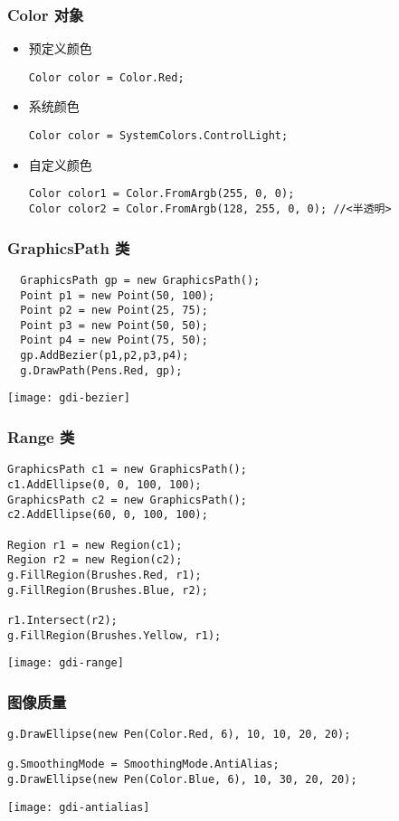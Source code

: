 \begin{frame}[fragile]
\frametitle{Color 对象}
\begin{itemize}
\item 预定义颜色
\begin{lstlisting}
Color color = Color.Red;
\end{lstlisting}
\item 系统颜色
\begin{lstlisting}
Color color = SystemColors.ControlLight;
\end{lstlisting}
\item 自定义颜色
\begin{lstlisting}[escapeinside=<>]
Color color1 = Color.FromArgb(255, 0, 0);
Color color2 = Color.FromArgb(128, 255, 0, 0); //<半透明>
\end{lstlisting}
\end{itemize}
\end{frame}

\begin{frame}[fragile]
\frametitle{GraphicsPath 类}
\begin{lstlisting}
  GraphicsPath gp = new GraphicsPath();
  Point p1 = new Point(50, 100);
  Point p2 = new Point(25, 75);
  Point p3 = new Point(50, 50);
  Point p4 = new Point(75, 50);
  gp.AddBezier(p1,p2,p3,p4);
  g.DrawPath(Pens.Red, gp);
\end{lstlisting}
\texttt{[image: gdi-bezier]}
\end{frame}

\begin{frame}[fragile]
\frametitle{Range 类}
\begin{lstlisting}
GraphicsPath c1 = new GraphicsPath();
c1.AddEllipse(0, 0, 100, 100);
GraphicsPath c2 = new GraphicsPath();
c2.AddEllipse(60, 0, 100, 100);

Region r1 = new Region(c1);
Region r2 = new Region(c2);
g.FillRegion(Brushes.Red, r1);
g.FillRegion(Brushes.Blue, r2);

r1.Intersect(r2);
g.FillRegion(Brushes.Yellow, r1);
\end{lstlisting}
\texttt{[image: gdi-range]}
\end{frame}


\begin{frame}[fragile]
\frametitle{图像质量}
\begin{lstlisting}
g.DrawEllipse(new Pen(Color.Red, 6), 10, 10, 20, 20);

g.SmoothingMode = SmoothingMode.AntiAlias;
g.DrawEllipse(new Pen(Color.Blue, 6), 10, 30, 20, 20);
\end{lstlisting}
\texttt{[image: gdi-antialias]}
\end{frame}

